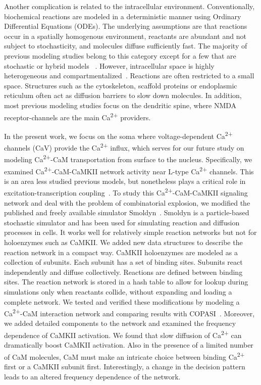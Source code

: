 \documentclass[10pt,letterpaper]{article}
\begin{document}
Another complication is related to the intracellular environment. Conventionally, biochemical reactions are modeled in a deterministic manner using Ordinary Differential Equations (ODEs). The underlying assumptions are that reactions occur in a spatially homogenous environment, reactants are abundant and not subject to stochasticity, and molecules diffuse sufficiently fast. The majority of previous modeling studies belong to this category except for a few that are stochastic or hybrid models ~\cite{Bhalla:2004cu, Zeng:2010bq, Holmes:2000uk}. However, intracellular space is highly heterogeneous and compartmentalized~\cite{LubyPhelps:2000uj,Dix:2008gy}. Reactions are often restricted to a small space. Structures such as the cytoskeleton, scaffold proteins or endoplasmic reticulum often act as diffusion barriers to slow down molecules. In addition, most previous modeling studies focus on the dendritic spine, where NMDA receptor-channels are the main Ca\textsuperscript{2+} providers. 

In the present work, we focus on the soma where voltage-dependent Ca\textsuperscript{2+} channels (CaV) provide the Ca\textsuperscript{2+} influx, which serves for our future study on modeling Ca\textsuperscript{2+}-CaM transportation from surface to the nucleus. Specifically, we examined Ca\textsuperscript{2+}-CaM-CaMKII network activity near L-type Ca\textsuperscript{2+} channels. This is an area less studied previous models, but nonetheless plays a critical role in excitation-transcription coupling~\cite{Ma:2015bg,Li:2016cq}. To study this Ca\textsuperscript{2+}-CaM-CaMKII signaling network and deal with the problem of combinatorial explosion, we modified the published and freely available simulator Smoldyn~\cite{Andrews:2004fs}. Smoldyn is a particle-based stochastic simulator and has been used for simulating reaction and diffusion processes in cells. It works well for relatively simple reaction networks but not for holoenzymes such as CaMKII. We added new data structures to describe the reaction network in a compact way. CaMKII holoenzymes are modeled as a collection of subunits. Each subunit has a set of binding sites. Subunits react independently and diffuse collectively. Reactions are defined between binding sites. The reaction network is stored in a hash table to allow for lookup during simulations only when reactants collide, without expanding and loading a complete network. We tested and verified these modifications by modeling a Ca\textsuperscript{2+}-CaM interaction network and comparing results with COPASI~\cite{Hoops:2006gy}. Moreover, we added detailed components to the network and examined the frequency dependence of CaMKII activation. We found that slow diffusion of Ca\textsuperscript{2+} can dramatically boost CaMKII activation. Also in the presence of a limited number of CaM molecules, CaM must make an intricate choice between binding Ca\textsuperscript{2+} first or a CaMKII subunit first. Interestingly, a change in the decision pattern leads to an altered frequency dependence of the network. 
\end{document}
